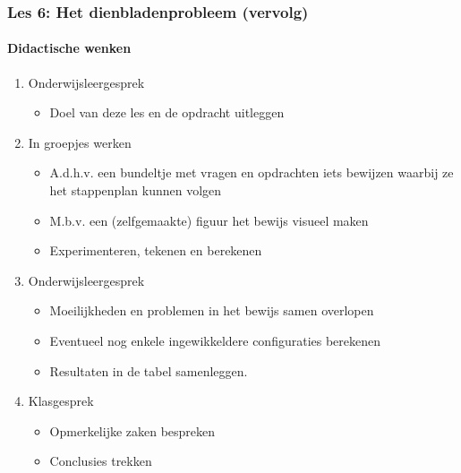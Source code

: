 \documentclass[dutch]{beamer}
\begin{document}
\begin{frame}
\frametitle{Les 6: Het dienbladenprobleem {\small (vervolg)}}
\framesubtitle{Didactische wenken}

\begin{enumerate}
	\item Onderwijsleergesprek
	\begin{itemize}
	\item Doel van deze les en de opdracht uitleggen
\end{itemize}
	
	\item In groepjes werken
	\begin{itemize}
	\item A.d.h.v. een bundeltje met vragen en opdrachten iets bewijzen waarbij ze het stappenplan kunnen volgen
	\item M.b.v. een (zelfgemaakte) figuur het bewijs visueel maken
	\item Experimenteren, tekenen en berekenen
\end{itemize}

  \item Onderwijsleergesprek
  \begin{itemize}
  \item Moeilijkheden en problemen in het bewijs samen overlopen
  \item Eventueel nog enkele ingewikkeldere configuraties berekenen
	\item Resultaten in de tabel samenleggen.
\end{itemize}

  \item Klasgesprek
  \begin{itemize}
	  \item Opmerkelijke zaken bespreken
	  \item Conclusies trekken
  \end{itemize}
\end{enumerate}
\end{frame}



\end{document}
